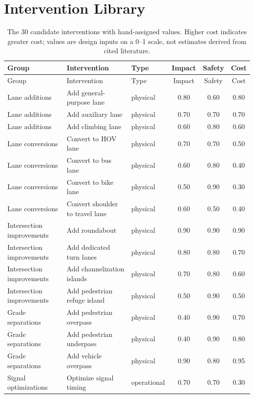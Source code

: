 \documentclass[11pt]{article}
\begin{document}
\clearpage
\section{Intervention Library}
\begin{longtable}{P{0.19\textwidth} P{0.31\textwidth} P{0.13\textwidth} c c c}
\caption{The 30 candidate interventions with hand-assigned values. Higher cost indicates greater cost; values are design inputs on a 0--1 scale, not estimates derived from cited literature.}\label{tab:library}\\
\toprule Group & Intervention & Type & Impact & Safety & Cost \\
\midrule
\endfirsthead
\toprule Group & Intervention & Type & Impact & Safety & Cost \\
\midrule
\endhead
Lane additions & Add general-purpose lane & physical & 0.80 & 0.60 & 0.80 \\
Lane additions & Add auxiliary lane & physical & 0.70 & 0.70 & 0.70 \\
Lane additions & Add climbing lane & physical & 0.60 & 0.80 & 0.60 \\
Lane conversions & Convert to HOV lane & physical & 0.70 & 0.70 & 0.50 \\
Lane conversions & Convert to bus lane & physical & 0.60 & 0.80 & 0.40 \\
Lane conversions & Convert to bike lane & physical & 0.50 & 0.90 & 0.30 \\
Lane conversions & Convert shoulder to travel lane & physical & 0.60 & 0.50 & 0.40 \\
Intersection improvements & Add roundabout & physical & 0.90 & 0.90 & 0.90 \\
Intersection improvements & Add dedicated turn lanes & physical & 0.80 & 0.80 & 0.70 \\
Intersection improvements & Add channelization islands & physical & 0.70 & 0.80 & 0.60 \\
Intersection improvements & Add pedestrian refuge island & physical & 0.50 & 0.90 & 0.50 \\
Grade separations & Add pedestrian overpass & physical & 0.40 & 0.90 & 0.70 \\
Grade separations & Add pedestrian underpass & physical & 0.40 & 0.90 & 0.80 \\
Grade separations & Add vehicle overpass & physical & 0.90 & 0.80 & 0.95 \\
Signal optimizations & Optimize signal timing & operational & 0.70 & 0.70 & 0.30 \\

\end{longtable}
\end{document}
